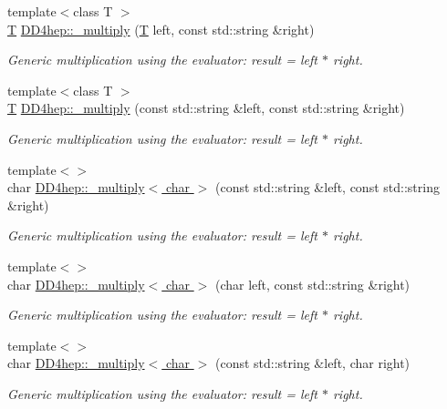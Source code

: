 \begin{DoxyCompactItemize}
{\footnotesize template$<$class T $>$ }\\\hyperlink{class_t}{T} \hyperlink{group___d_d4_h_e_p___g_e_o_m_e_t_r_y_gabe3cff353a2e01c4a517e459ea02c894}{D\+D4hep\+::\+\_\+multiply} (\hyperlink{class_t}{T} left, const std\+::string \&right)
\begin{DoxyCompactList}\small\item\em Generic multiplication using the evaluator\+: result = left $\ast$ right. \end{DoxyCompactList}\item 
{\footnotesize template$<$class T $>$ }\\\hyperlink{class_t}{T} \hyperlink{group___d_d4_h_e_p___g_e_o_m_e_t_r_y_gaaf4c3427557d2eddc19076b560478671}{D\+D4hep\+::\+\_\+multiply} (const std\+::string \&left, const std\+::string \&right)
\begin{DoxyCompactList}\small\item\em Generic multiplication using the evaluator\+: result = left $\ast$ right. \end{DoxyCompactList}\item 
{\footnotesize template$<$$>$ }\\char \hyperlink{group___d_d4_h_e_p___g_e_o_m_e_t_r_y_gae0b71c01cdf574471bd4de41a7dd522d}{D\+D4hep\+::\+\_\+multiply$<$ char $>$} (const std\+::string \&left, const std\+::string \&right)
\begin{DoxyCompactList}\small\item\em Generic multiplication using the evaluator\+: result = left $\ast$ right. \end{DoxyCompactList}\item 
{\footnotesize template$<$$>$ }\\char \hyperlink{group___d_d4_h_e_p___g_e_o_m_e_t_r_y_ga95129879194709ba020c55216963ca8c}{D\+D4hep\+::\+\_\+multiply$<$ char $>$} (char left, const std\+::string \&right)
\begin{DoxyCompactList}\small\item\em Generic multiplication using the evaluator\+: result = left $\ast$ right. \end{DoxyCompactList}\item 
{\footnotesize template$<$$>$ }\\char \hyperlink{group___d_d4_h_e_p___g_e_o_m_e_t_r_y_gaa85ae2bec079bd13cad85dd933cae0bc}{D\+D4hep\+::\+\_\+multiply$<$ char $>$} (const std\+::string \&left, char right)
\begin{DoxyCompactList}\small\item\em Generic multiplication using the evaluator\+: result = left $\ast$ right. \end{DoxyCompactList}\item 

\end{DoxyCompactItemize}
